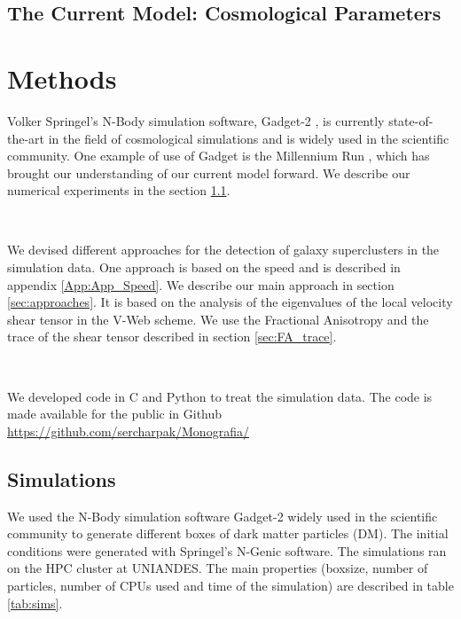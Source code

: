 \documentclass[12pt]{article}
\begin{document}
\subsection{The Current Model: Cosmological Parameters}
\section{Methods}
\begin{par}
Volker Springel's N-Body simulation software,
 Gadget-2 \cite{springel_gadget_2_2005}, is
  currently state-of-the-art in the field of
   cosmological simulations and is widely used in
    the scientific community. One example of use of
     Gadget is the Millennium Run
      \cite{springel_simulations_2005}, which has
       brought our understanding of our current
        model forward. We describe our numerical
         experiments in the section \ref{sec:sims}.
\end{par}
\\
\begin{par}
We devised different approaches for the detection of
 galaxy superclusters in the simulation data. One
  approach is based on the speed and is described in
   appendix \ref{App:App_Speed}. We describe our
    main approach in section \ref{sec:approaches}.
     It is based on the analysis of the 
    eigenvalues of the local velocity shear tensor
     in the V-Web scheme. We use the Fractional
      Anisotropy and the trace of the shear tensor
       described in section \ref{sec:FA_trace}. 
\end{par}
\\
\begin{par}
We developed code in C and Python to treat the
 simulation data. The code is made available for the
  public in Github
   \url{https://github.com/sercharpak/Monografia/}
\end{par}


\subsection{Simulations}\label{sec:sims}
We used the N-Body simulation software Gadget-2
 \cite{springel_gadget_2_2005}
widely used in the scientific community to
 generate different boxes of dark matter particles
  (DM). The initial conditions were
generated with Springel's N-Genic software. The
 simulations ran on the HPC cluster at UNIANDES.
  The main properties (boxsize, number of
   particles, number of CPUs used and time of the
    simulation) are described in table
     \ref{tab:sims}. \\
\end{document}
